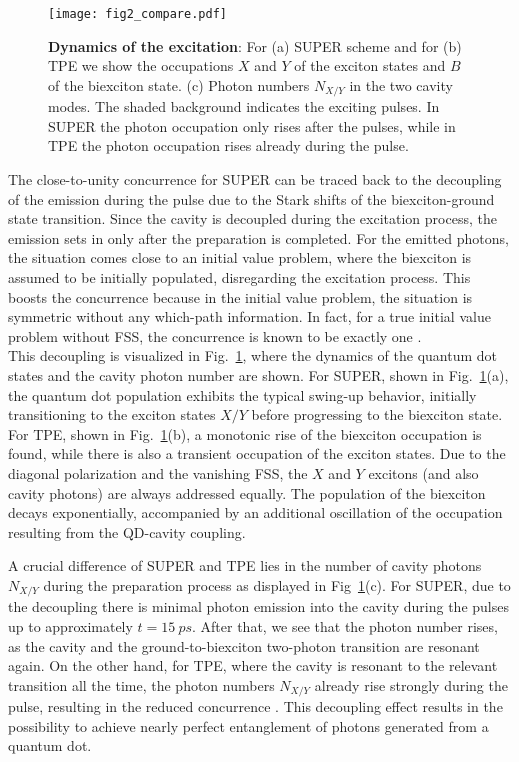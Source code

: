 \documentclass[%
 reprint,superscriptaddress,
 amsmath,amssymb,
 aps]{revtex4-2}
\begin{document}
\begin{figure}
    \centering
    \texttt{[image: fig2\_compare.pdf]}
    \caption{\textbf{Dynamics of the excitation}: For (a) SUPER scheme and for (b) TPE we show the occupations $X$ and $Y$ of the exciton states and $B$ of the biexciton state. (c) Photon numbers $N_{X/Y}$ in the two cavity modes. The shaded background indicates the exciting pulses. In SUPER the photon occupation only rises after the pulses, while in TPE the photon occupation rises already during the pulse.}
    \label{fig:dynamics_compare_cavity}
\end{figure}

The close-to-unity concurrence for SUPER can be traced back to the decoupling of the emission during the pulse due to the Stark shifts of the biexciton-ground state transition. Since the cavity is decoupled during the excitation process, the emission sets in only after the preparation is completed. For the emitted photons, the situation comes close to an initial value problem, where the biexciton is assumed to be initially populated, disregarding the excitation process. This boosts the concurrence because in the initial value problem, the situation is symmetric without any which-path information. In fact, for a true initial value problem without FSS, the concurrence is known to be exactly one \cite{carmele,seidelmann2019from}. \\
This decoupling is visualized in Fig.~\ref{fig:dynamics_compare_cavity}, where the dynamics of the quantum dot states and the cavity photon number are shown. For SUPER, shown in Fig.~\ref{fig:dynamics_compare_cavity}(a), the quantum dot population exhibits the typical swing-up behavior, initially transitioning to the exciton states $X/Y$ before progressing to the biexciton state. For TPE, shown in Fig.~\ref{fig:dynamics_compare_cavity}(b), a monotonic rise of the biexciton occupation is found, while there is also a transient occupation of the exciton states. Due to the diagonal polarization and the vanishing FSS, the $X$ and $Y$ excitons (and also cavity photons) are always addressed equally. The population of the biexciton decays exponentially, accompanied by an additional oscillation of the occupation resulting from the QD-cavity coupling.

A crucial difference of SUPER and TPE lies in the number of cavity photons $N_{X/Y}$ during the preparation process as displayed in Fig~\ref{fig:dynamics_compare_cavity}(c). For SUPER, due to the decoupling there is minimal photon emission into the cavity during the pulses up to approximately $t=\SI{15}{ps}$. After that, we see that the photon number rises, as the cavity and the ground-to-biexciton two-photon transition are resonant again. On the other hand, for TPE, where the cavity is resonant to the relevant transition all the time, the photon numbers $N_{X/Y}$ already rise strongly during the pulse, resulting in the reduced concurrence \cite{seidelmann2022two}. This decoupling effect results in the possibility to achieve nearly perfect entanglement of photons generated from a quantum dot. 
\end{document}
